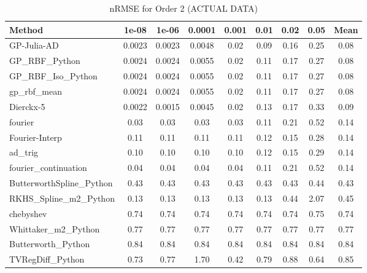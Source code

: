 \begin{table}[htbp]
\centering
\caption{nRMSE for Order 2 (ACTUAL DATA)}
\label{tab:order_2}
\tiny
\begin{tabular}{lcccccccc}
\toprule
\textbf{Method} & \textbf{1e-08} & \textbf{1e-06} & \textbf{0.0001} & \textbf{0.001} & \textbf{0.01} & \textbf{0.02} & \textbf{0.05} & \textbf{Mean} \\
\midrule
GP-Julia-AD & 0.0023 & 0.0023 & 0.0048 & 0.02 & 0.09 & 0.16 & 0.25 & 0.08 \\
GP_RBF_Python & 0.0024 & 0.0024 & 0.0055 & 0.02 & 0.11 & 0.17 & 0.27 & 0.08 \\
GP_RBF_Iso_Python & 0.0024 & 0.0024 & 0.0055 & 0.02 & 0.11 & 0.17 & 0.27 & 0.08 \\
gp_rbf_mean & 0.0024 & 0.0024 & 0.0055 & 0.02 & 0.11 & 0.17 & 0.27 & 0.08 \\
Dierckx-5 & 0.0022 & 0.0015 & 0.0045 & 0.02 & 0.13 & 0.17 & 0.33 & 0.09 \\
fourier & 0.03 & 0.03 & 0.03 & 0.03 & 0.11 & 0.21 & 0.52 & 0.14 \\
Fourier-Interp & 0.11 & 0.11 & 0.11 & 0.11 & 0.12 & 0.15 & 0.28 & 0.14 \\
ad_trig & 0.10 & 0.10 & 0.10 & 0.10 & 0.12 & 0.15 & 0.29 & 0.14 \\
fourier_continuation & 0.04 & 0.04 & 0.04 & 0.04 & 0.11 & 0.21 & 0.52 & 0.14 \\
ButterworthSpline_Python & 0.43 & 0.43 & 0.43 & 0.43 & 0.43 & 0.43 & 0.44 & 0.43 \\
RKHS_Spline_m2_Python & 0.13 & 0.13 & 0.13 & 0.13 & 0.13 & 0.44 & 2.07 & 0.45 \\
chebyshev & 0.74 & 0.74 & 0.74 & 0.74 & 0.74 & 0.74 & 0.75 & 0.74 \\
Whittaker_m2_Python & 0.77 & 0.77 & 0.77 & 0.77 & 0.77 & 0.77 & 0.77 & 0.77 \\
Butterworth_Python & 0.84 & 0.84 & 0.84 & 0.84 & 0.84 & 0.84 & 0.84 & 0.84 \\
TVRegDiff_Python & 0.73 & 0.77 & 1.70 & 0.42 & 0.79 & 0.88 & 0.64 & 0.85 \\
\bottomrule
\end{tabular}
\end{table}
